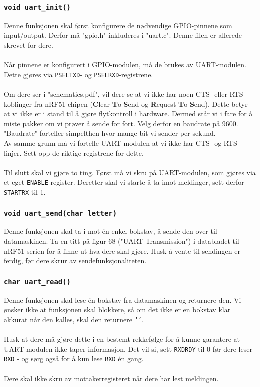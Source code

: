 \documentclass[11pt,a4paper]{article}
\begin{document}
\subsubsection{\texorpdfstring{\texttt{void uart_init()}}{void uart\_init()}}
Denne funksjonen skal først konfigurere de nødvendige GPIO-pinnene som input/output. Derfor må "gpio.h" inkluderes i "uart.c". Denne filen er allerede skrevet for dere.\\
\\
Når pinnene er konfigurert i GPIO-modulen, må de brukes av UART-modulen. Dette gjøres via \texttt{PSELTXD}- og \texttt{PSELRXD}-registrene.\\
\\
Om dere ser i "schematics.pdf", vil dere se at vi ikke har noen CTS- eller RTS-koblinger fra nRF51-chipen (\textbf{C}lear \textbf{T}o \textbf{S}end og \textbf{R}equest \textbf{T}o \textbf{S}end). Dette betyr at vi ikke er i stand til å gjøre flytkontroll i hardware. Dermed står vi i fare for å miste pakker om vi prøver å sende for fort. Velg derfor en baudrate på 9600. "Baudrate" forteller simpelthen hvor mange bit vi sender per sekund.\\
Av samme grunn må vi fortelle UART-modulen at vi ikke har CTS- og RTS-linjer. Sett opp de riktige registrene for dette.\\
\\
Til slutt skal vi gjøre to ting. Først må vi skru på UART-modulen, som gjøres via et eget \texttt{ENABLE}-register. Deretter skal vi starte å ta imot meldinger, sett derfor \texttt{STARTRX} til 1.

\subsubsection{\texorpdfstring{\texttt{void uart_send(char letter)}}{void uart\_send(char letter)}}
Denne funksjonen skal ta i mot én enkel bokstav, å sende den over til datamaskinen. Ta en titt på figur 68 ("UART Transmission") i databladet til nRF51-serien for å finne ut hva dere skal gjøre. Husk å vente til sendingen er ferdig, før dere skrur av sendefunksjonaliteten.

\subsubsection{\texorpdfstring{\texttt{char uart_read()}}{char uart\_read()}}
Denne funksjonen skal lese én bokstav fra datamaskinen og returnere den. Vi ønsker ikke at funksjonen skal blokkere, så om det ikke er en bokstav klar akkurat når den kalles, skal den returnere \texttt{'\0'}.\\
\\
Husk at dere må gjøre dette i en bestemt rekkefølge for å kunne garantere at UART-modulen ikke taper informasjon. Det vil si, sett \texttt{RXDRDY} til 0 før dere leser \texttt{RXD} - og sørg også for å kun lese \texttt{RXD} én gang.\\
\\
Dere skal ikke skru av mottakerregisteret når dere har lest meldingen.
\end{document}
